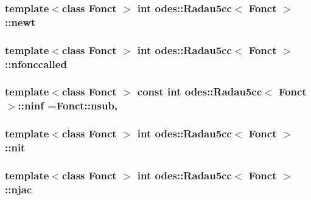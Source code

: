 \subsubsection[{newt}]{\setlength{\rightskip}{0pt plus 5cm}template$<$class Fonct $>$ int {\bf odes\+::\+Radau5cc}$<$ Fonct $>$\+::newt\hspace{0.3cm}{\ttfamily [private]}}\label{classodes_1_1Radau5cc_a957de41c2a36e2f254836a6c05dbfb92}
\hypertarget{classodes_1_1Radau5cc_a6363884e5172cc77c13a1d9ca9ed630a}{}
\subsubsection[{nfonccalled}]{\setlength{\rightskip}{0pt plus 5cm}template$<$class Fonct $>$ int {\bf odes\+::\+Radau5cc}$<$ Fonct $>$\+::nfonccalled\hspace{0.3cm}{\ttfamily [private]}}\label{classodes_1_1Radau5cc_a6363884e5172cc77c13a1d9ca9ed630a}
\hypertarget{classodes_1_1Radau5cc_ac47e67a43369971eeb08c2d2200a76d5}{}
\subsubsection[{ninf}]{\setlength{\rightskip}{0pt plus 5cm}template$<$class Fonct $>$ const int {\bf odes\+::\+Radau5cc}$<$ Fonct $>$\+::ninf =Fonct\+::nsub\hspace{0.3cm}{\ttfamily [static]}, {\ttfamily [private]}}\label{classodes_1_1Radau5cc_ac47e67a43369971eeb08c2d2200a76d5}
\hypertarget{classodes_1_1Radau5cc_a98eae21674bed3d783e49f92f7c38a20}{}
\subsubsection[{nit}]{\setlength{\rightskip}{0pt plus 5cm}template$<$class Fonct $>$ int {\bf odes\+::\+Radau5cc}$<$ Fonct $>$\+::nit\hspace{0.3cm}{\ttfamily [private]}}\label{classodes_1_1Radau5cc_a98eae21674bed3d783e49f92f7c38a20}
\hypertarget{classodes_1_1Radau5cc_ade6f8961bd6dacdc3e89761d8af04172}{}
\subsubsection[{njac}]{\setlength{\rightskip}{0pt plus 5cm}template$<$class Fonct $>$ int {\bf odes\+::\+Radau5cc}$<$ Fonct $>$\+::njac\hspace{0.3cm}{\ttfamily [private]}}\label{classodes_1_1Radau5cc_ade6f8961bd6dacdc3e89761d8af04172}
\hypertarget{classodes_1_1Radau5cc_a42980e5cf06bc0f4c1a0ef1a1922615f}{}
